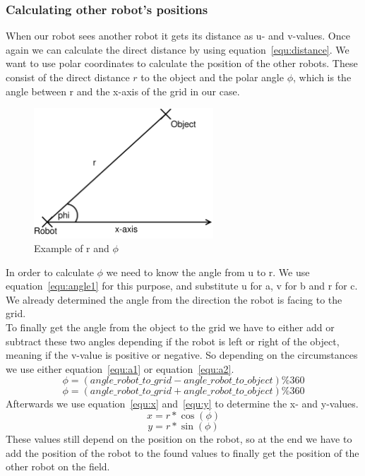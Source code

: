 \documentclass[lnicst,a4paper]{svmultln}
\begin{document}
\subsubsection{Calculating other robot's positions}
When our robot sees another robot it gets its distance as u- and v-values. Once again we can calculate the direct distance by using equation~\ref{equ:distance}. We want to use polar coordinates to calculate the position of the other robots. These consist of the direct distance \(r\) to the object and the polar angle \(\phi\), which is the angle between r and the x-axis of the grid in our case. 
\begin{figure}
 	\centerline{\includegraphics[width=0.6\textwidth]{polar.pdf}}
	{\caption{Example of r and \(\phi\)}\label{fig:polar}}
\end{figure}
In order to calculate \(\phi\) we need to know the angle from u to r. We use equation~\ref{equ:angle1} for this purpose, and substitute u for a, v for b and r for c. 
\\
We already determined the angle from the direction the robot is facing to the grid.
\\
To finally get the angle from the object to the grid we have to either add or subtract these two angles depending if the robot is left or right of the object, meaning if the v-value is positive or negative. So depending on the circumstances we use either equation~\ref{equ:a1} or equation~\ref{equ:a2}.
\begin{equation}
	\phi = (angle\_robot\_to\_grid - angle\_robot\_to\_object) \% 360
	\label{equ:a1}
\end{equation}
\begin{equation}
	\phi = (angle\_robot\_to\_grid + angle\_robot\_to\_object) \% 360
	\label{equ:a2}
\end{equation}
Afterwards we use equation~\ref{equ:x} and~\ref{equ:y} to determine the x- and y-values.
\begin{equation}
	x = r*\cos(\phi)
	\label{equ:x}
\end{equation}
\begin{equation}
	y = r*\sin(\phi)
	\label{equ:y}
\end{equation}
These values still depend on the position on the robot, so at the end we have to add the position of the robot to the found values to finally get the position of the other robot on the field.
\end{document}
